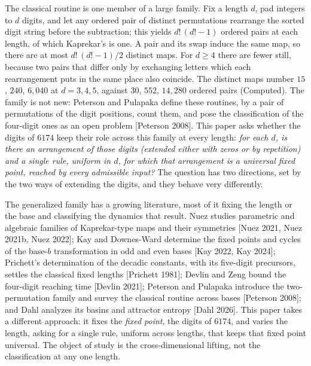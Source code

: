\documentclass[11pt,letterpaper]{article}
\theoremstyle{paperstyle}
\theoremstyle{paperstyledef}
\theoremstyle{paperstylerem}
\begin{document}
The classical routine is one member of a large family. Fix a length \(d\), pad integers to \(d\) digits, and let any ordered pair of distinct permutations rearrange the sorted digit string before the subtraction; this yields \(d!\,(d!-1)\) ordered pairs at each length, of which Kaprekar's is one. A pair and its swap induce the same map, so there are at most \(d!\,(d!-1)/2\) distinct maps. For \(d \geq 4\) there are fewer still, because two pairs that differ only by exchanging letters which each rearrangement puts in the same place also coincide. The distinct maps number \(15\), \(240\), \(6{,}040\) at \(d = 3, 4, 5\), against \(30\), \(552\), \(14{,}280\) ordered pairs (Computed). The family is not new: Peterson and Pulapaka define these routines, by a pair of permutations of the digit positions, count them, and pose the classification of the four-digit ones as an open problem {[}Peterson 2008{]}. This paper asks whether the digits of \(6174\) keep their role across this family at every length: \emph{for each \(d\), is there an arrangement of those digits (extended either with zeros or by repetition) and a single rule, uniform in \(d\), for which that arrangement is a universal fixed point, reached by every admissible input?} The question has two directions, set by the two ways of extending the digits, and they behave very differently.

The generalized family has a growing literature, most of it fixing the length or the base and classifying the dynamics that result. Nuez studies parametric and algebraic families of Kaprekar-type maps and their symmetries {[}Nuez 2021, Nuez 2021b, Nuez 2022{]}; Kay and Downes-Ward determine the fixed points and cycles of the base-\(b\) transformation in odd and even bases {[}Kay 2022, Kay 2024{]}; Prichett's determination of the decadic constants, with its five-digit precursors, settles the classical fixed lengths {[}Prichett 1981{]}; Devlin and Zeng bound the four-digit reaching time {[}Devlin 2021{]}; Peterson and Pulapaka introduce the two-permutation family and survey the classical routine across bases {[}Peterson 2008{]}; and Dahl analyzes its basins and attractor entropy {[}Dahl 2026{]}. This paper takes a different approach: it fixes the \emph{fixed point}, the digits of \(6174\), and varies the length, asking for a single rule, uniform across lengths, that keeps that fixed point universal. The object of study is the cross-dimensional lifting, not the classification at any one length.
\end{document}
